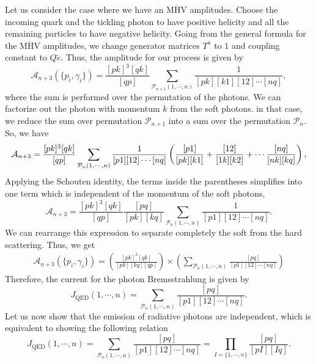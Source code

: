 Let us consider the case where we have an $\overline{\text{MHV}}$ amplitudes. Choose the incoming quark and the tickling photon to have positive helicity and all the remaining particles to have negative helicity. Going from the general formula for the $\overline{\text{MHV}}$ amplitudes, we change generator matrices $T^{a}$ to $1$ and coupling constant to $Q\tilde{e}$. Thus, the amplitude for our process is given by
\begin{equation}
\mathcal{A}_{n+3}(\{p_i,\gamma_i\})=\frac{[pk]^3[qk]}{[qp]} \sum_{\mathcal{P}_{n+1}(1,\cdots , n)} \frac{1}{[pk] [k1] [12] \cdots [nq]},
\end{equation}
where the sum is performed over the permutation of the photons. We can factorize out the photon with momentum $k$ from the soft photons. in that case, we reduce the sum over permutation $\mathcal{P}_{n+1}$ into a sum over the permutation $\mathcal{P}_{n}$. So, we have
\begin{equation}
\mathcal{A}_{n+3}=\frac{[pk]^3[qk]}{[qp]} \sum_{\mathcal{P}_{n}(1,\cdots , n)} \frac{1}{[p1] [12] \cdots [nq]} \left( \frac{[p 1]}{[p k] [k 1]}+\frac{[1 2]}{[1 k] [k 2]}+ \cdots \frac{[n q]}{[n k] [k q]} \right) ,
\end{equation}
Applying the Schouten identity, the terms inside the parentheses simplifies into one term which is independent of the momentum of the soft photons, 
\begin{equation}
\mathcal{A}_{n+3}=\frac{[pk]^3[qk]}{[qp]} \frac{[pq]}{[pk] [kq]} \sum_{\mathcal{P}_{n}(1,\cdots , n)} \frac{1}{[p1] [12] \cdots [nq]}.
\label{softphoton1}
\end{equation}
We can rearrange this expression to separate completely the soft from the hard scattering. Thus, we get
\begin{align}
\mathcal{A}_{n+3}(\{p_i,\gamma_i\})=\left( \frac{[pk]^3[qk]}{[pk] [kq] [qp]} \right) \times \left( \sum_{\mathcal{P}_{n}(1,\cdots , n)} \frac{[pq]}{[p1] [12] \cdots [nq]} \right)
\end{align}
Therefore, the current for the photon Bremsstrahlung is given by 
\begin{equation}
J_{\text{QED}} (1, \cdots ,n)=\sum_{\mathcal{P}_{n}(1,\cdots , n)} \frac{[pq]}{[p1] [12] \cdots [nq]}.
\end{equation}
Let us now show that the emission of radiative photons are independent, which is equivalent to showing the following relation 
\begin{equation}
J_{\text{QED}} (1, \cdots ,n)=\sum_{\mathcal{P}_{n}(1,\cdots , n)} \frac{[pq]}{[p1] [12] \cdots [nq]}= \prod_{I=\{1, \cdots , n\}} \frac{[pq]}{[pI] [Iq]}.
\label{identity}
\end{equation}
